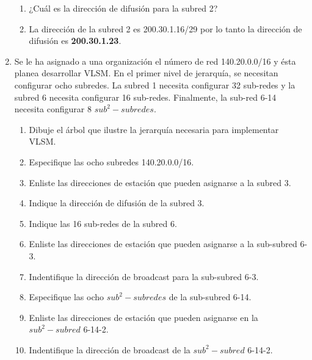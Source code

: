 \begin{enumerate}
\begin{enumerate}
        \item ¿Cu\'al es la direcci\'on de difusi\'on para la subred 2?
        \item[] La direcci\'on de la subred 2 es 200.30.1.16/29 por lo tanto la direcci\'on de difusi\'on es
        \textbf{200.30.1.23}.
    \end{enumerate}

    \item Se le ha asignado a una organizaci\'on el n\'umero de red 140.20.0.0/16 y \'esta planea desarrollar VLSM. En el primer
    nivel de jerarqu\'ia, se necesitan configurar ocho subredes. La subred 1 necesita configurar 32 sub-redes y la subred 6
    necesita configurar 16 sub-redes. Finalmente, la sub-red 6-14 necesita configurar 8 \(sub^2-subredes\).
    \begin{enumerate}
        \item Dibuje el \'arbol que ilustre la jerarqu\'ia necesaria para implementar VLSM.
        \item Especifique las ocho subredes 140.20.0.0/16.
        \item Enliste las direcciones de estaci\'on que pueden asignarse a la subred 3.
        \item Indique la direcci\'on de difusi\'on de la subred 3.
        \item Indique las 16 sub-redes de la subred 6.
        \item Enliste las direcciones de estaci\'on que pueden asignarse a la sub-subred 6-3.
        \item Indentifique la direcci\'on de broadcast para la sub-subred 6-3.
        \item Especifique las ocho \(sub^2-subredes\) de la sub-subred 6-14.
        \item Enliste las direcciones de estaci\'on que pueden asignarse en la \(sub^2-subred\) 6-14-2.
        \item Indentifique la direcci\'on de broadcast de la \(sub^2-subred\) 6-14-2.
    \end{enumerate}


\end{enumerate}
